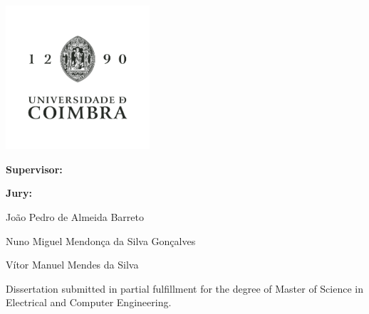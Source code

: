 \begin{titlepage}
    \begin{center}
    \includegraphics[width=0.4\textwidth]{images/UC_logos/UC_V_FundoClaro-negro.png}
    
    \vspace{0.8cm}
    {\Huge{\textbf{\thesistitle}}\par}
    
    \vspace{1cm}
    {\large{\textbf{Supervisor:}\\\supervisorname\par}}
    \vspace{5mm}
    
    \vspace{1cm}
    {\large{\textbf{Jury:}
    
    João Pedro de Almeida Barreto
    
    Nuno Miguel Mendonça da Silva Gonçalves
    
    Vítor Manuel Mendes da Silva
    
    }}
    
    \vfill
    Dissertation submitted in partial fulfillment for the degree of Master of Science in Electrical and Computer Engineering.
    
    \vspace{0.5cm}
    {\large \statedate\par}    
    
    
    \end{center}
\end{titlepage}